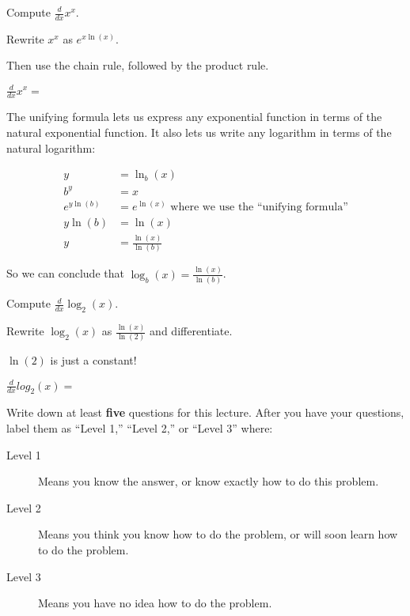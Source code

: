 \documentclass{ximera}
\begin{document}
\begin{question}
  Compute $\frac{d}{dx} x^x$.
  
  \begin{hint}
    Rewrite $x^x$ as $e^{x\ln(x)}$.
  \end{hint}
  \begin{hint}
    Then use the chain rule, followed by the product rule.
  \end{hint}
  $\frac{d}{dx} x^x = $ 
\end{question}

The unifying formula lets us express any exponential function in terms of the natural exponential function.  It also lets us write any logarithm in terms of the natural logarithm:

\begin{align*}
	y &= \ln_b(x)\\
	b^y &=  x\\
	e^{y\ln(b)} &= e^{\ln(x)} \text{ where we use the ``unifying formula''}\\
	y\ln(b) &= \ln(x)\\
	y &= \frac{\ln(x)}{\ln(b)}
\end{align*}

So we can conclude that $\log_b(x) = \frac{\ln(x)}{\ln(b)}$.

\begin{question}
	Compute $\frac{d}{dx} \log_2(x)$.
	\begin{hint}
	  Rewrite $\log_2(x)$ as $\frac{\ln(x)}{\ln(2)}$ and differentiate.
	\end{hint}
	\begin{hint}
	  $\ln(2)$ is just a constant!
	\end{hint}
	$\frac{d}{dx} log_2(x)=$
\end{question}


\begin{question}

Write down at least \textbf{five} questions for this lecture. After
you have your questions, label them as ``Level 1,'' ``Level 2,'' or ``Level 3'' where:
\begin{description}
\item[Level 1] Means you know the answer, or know exactly how to do this problem.
\item[Level 2] Means you think you know how to do the problem, or will soon learn how to do the problem.
\item[Level 3] Means you have no idea how to do the problem. 
\end{description}
  \begin{freeResponse}
  \end{freeResponse}
\end{question}
\end{document}
